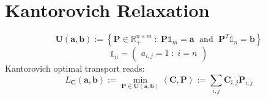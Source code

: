 \section{Kantorovich Relaxation}

$$
\mathbf{U}(\mathbf{a}, \mathbf{b}) := \left\{
\mathbf{P} \in \mathbb{R}_{+}^{n\times m} \; : \;
\mathbf{P} \mathbb{1}_{m} = \mathbf{a}
\; \text { and } \;
\mathbf{P}^{T} \mathbb{1}_{n} = \mathbf{b}
\right\}
$$
$$
\mathbb{1}_{n} = \begin{pmatrix}
a_{i, j} = 1 \; : \; i = n
\end{pmatrix}
$$
Kantorovich optimal transport reads:
$$
L_{\mathbf{C}}(\mathbf{a}, \mathbf{b}) :=
\min_{\mathbf{P} \in \mathbf{U}(\mathbf{a}, \mathbf{b})}
\left< \mathbf{C}, \mathbf{P} \right> :=
\sum_{i, j} \mathbf{C}_{i,j} \mathbf{P}_{i,j}
$$
